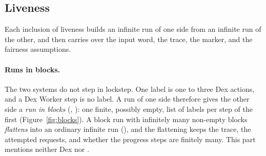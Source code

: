 \subsection{Liveness}
\label{sec:liveness-proof}

Each inclusion of liveness builds an infinite run of one side from an
infinite run of the other, and then carries over the input word, the trace,
the marker, and the fairness assumptions.

\paragraph{Runs in blocks.}
The two systems do not step in lockstep. One \Lang{} label is one to three
Dex actions, and a Dex Worker step is no \Lang{} label. A run of one side
therefore gives the other side a \emph{run in blocks}
(, ): one finite, possibly empty,
list of labels per step of the first (Figure~\ref{fig:blocks}). A block run
with infinitely many non-empty blocks \emph{flattens} into an ordinary
infinite run (), and the flattening keeps the
trace, the attempted requests, and whether the progress steps are finitely
many. This part mentions neither Dex nor \Lang{}.

